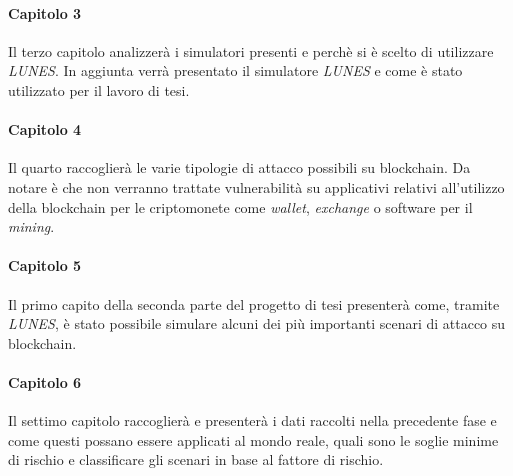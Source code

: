 \paragraph{Capitolo 3}
Il terzo capitolo analizzerà i simulatori presenti e perchè si è scelto di utilizzare \textit{LUNES}.
In aggiunta verrà presentato il simulatore \textit{LUNES} e come è stato utilizzato per il lavoro di tesi.

\paragraph{Capitolo 4}
Il quarto raccoglierà le varie tipologie di attacco possibili su blockchain. Da notare è che non verranno trattate vulnerabilità su applicativi relativi all'utilizzo della blockchain per le criptomonete come \textit{wallet}, \textit{exchange} o software per il \textit{mining}.

\paragraph{Capitolo 5}
Il primo capito della seconda parte del progetto di tesi presenterà come, tramite \textit{LUNES}, è stato possibile simulare alcuni dei più importanti scenari di attacco su blockchain.

\paragraph{Capitolo 6}
Il settimo capitolo raccoglierà e presenterà i dati raccolti nella precedente fase e come questi possano essere applicati al mondo reale, quali sono le soglie minime di rischio e classificare gli scenari in base al fattore di rischio.

